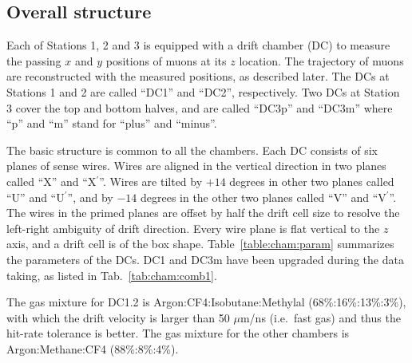 \subsection{Overall structure}

Each of Stations 1, 2 and 3 is equipped with a drift chamber (DC)
to measure the passing $x$ and $y$ positions of muons at its $z$ location.
The trajectory of muons are reconstructed with the measured positions,
as described later.
The DCs at Stations 1 and 2 are called ``DC1'' and ``DC2'', respectively.
Two DCs at Station 3 cover the top and bottom halves,
and are called ``DC3p'' and ``DC3m''
where ``p'' and ``m'' stand for ``plus'' and ``minus''.

The basic structure is common to all the chambers.
Each DC consists of six planes of sense wires.
Wires are aligned in the vertical direction
in two planes called ``X'' and ``X$^\prime$''.
Wires are tilted
by $+14$ degrees in other two planes called  ``U'' and ``U$^\prime$'', and
by $-14$ degrees in the other two planes called ``V'' and ``V$^\prime$''.
The wires in the primed planes are offset by half the drift cell size
to resolve the left-right ambiguity of drift direction.
Every wire plane is flat vertical to the $z$ axis, and a drift cell is of the box shape.
Table~\ref{table:cham:param} summarizes the parameters of the DCs.
DC1 and DC3m have been upgraded during the data taking,
as listed in Tab.~\ref{tab:cham:comb1}.

The gas mixture for DC1.2 is Argon:CF4:Isobutane:Methylal
(68\%:16\%:13\%:3\%), %
with which the drift velocity is larger than 50 $\mu$m/ns (i.e.~fast gas)
and thus the hit-rate tolerance is better.
The gas mixture for the other chambers is
Argon:Methane:CF4 (88\%:8\%:4\%).

